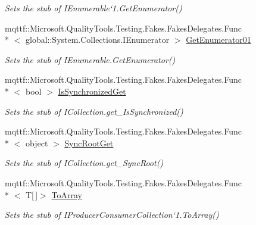 \begin{DoxyCompactItemize}
\begin{DoxyCompactList}\small\item\em Sets the stub of I\-Enumerable`1.Get\-Enumerator()\end{DoxyCompactList}\item 
mqttf\-::\-Microsoft.\-Quality\-Tools.\-Testing.\-Fakes.\-Fakes\-Delegates.\-Func\\*
$<$ global\-::\-System.\-Collections.\-I\-Enumerator $>$ \hyperlink{class_system_1_1_collections_1_1_concurrent_1_1_fakes_1_1_stub_i_producer_consumer_collection_3_01_t_01_4_a0965d28dca798e808fef723091bf8942}{Get\-Enumerator01}
\begin{DoxyCompactList}\small\item\em Sets the stub of I\-Enumerable.\-Get\-Enumerator()\end{DoxyCompactList}\item 
mqttf\-::\-Microsoft.\-Quality\-Tools.\-Testing.\-Fakes.\-Fakes\-Delegates.\-Func\\*
$<$ bool $>$ \hyperlink{class_system_1_1_collections_1_1_concurrent_1_1_fakes_1_1_stub_i_producer_consumer_collection_3_01_t_01_4_a87f0a93cc1a9ce2271f2e63e2044cff0}{Is\-Synchronized\-Get}
\begin{DoxyCompactList}\small\item\em Sets the stub of I\-Collection.\-get\-\_\-\-Is\-Synchronized()\end{DoxyCompactList}\item 
mqttf\-::\-Microsoft.\-Quality\-Tools.\-Testing.\-Fakes.\-Fakes\-Delegates.\-Func\\*
$<$ object $>$ \hyperlink{class_system_1_1_collections_1_1_concurrent_1_1_fakes_1_1_stub_i_producer_consumer_collection_3_01_t_01_4_af01273aa6b7d366edfa114213ba95cd1}{Sync\-Root\-Get}
\begin{DoxyCompactList}\small\item\em Sets the stub of I\-Collection.\-get\-\_\-\-Sync\-Root()\end{DoxyCompactList}\item 
mqttf\-::\-Microsoft.\-Quality\-Tools.\-Testing.\-Fakes.\-Fakes\-Delegates.\-Func\\*
$<$ T\mbox{[}$\,$\mbox{]}$>$ \hyperlink{class_system_1_1_collections_1_1_concurrent_1_1_fakes_1_1_stub_i_producer_consumer_collection_3_01_t_01_4_afca1d5248c07dad85073a595432b91a7}{To\-Array}
\begin{DoxyCompactList}\small\item\em Sets the stub of I\-Producer\-Consumer\-Collection`1.To\-Array()\end{DoxyCompactList}\item 

\end{DoxyCompactItemize}
